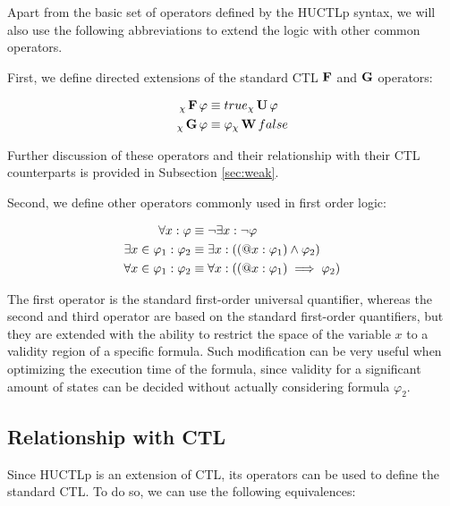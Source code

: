 Apart from the basic set of operators defined by the \ac{HUCTLp} syntax, we will also use the following abbreviations to extend the logic with other common operators.

First, we define directed extensions of the standard \ac{CTL} $\operatorname{\mathbf{F}}$ and $\operatorname{\mathbf{G}}$ operators:

\begin{align*}
	{}_{\chi}\operatorname{\mathbf{F}} \varphi 				 & \equiv true {}_{\chi}\operatorname{\mathbf{U}} \varphi \\
	{}_{\chi}\operatorname{\mathbf{G}} \varphi 				& \equiv \varphi {}_{\chi}\operatorname{\mathbf{W}} false \\
\end{align*}

Further discussion of these operators and their relationship with their \ac{CTL} counterparts is provided in Subsection \ref{sec:weak}.

Second, we define other operators commonly used in first order logic:

\begin{align*}
	\forall x : \varphi 		   		& \equiv \neg \exists x : \neg \varphi \\
	\exists x \in \varphi_1 : \varphi_2 & \equiv \exists x : ((\operatorname{@\!} x : \varphi_1) \land \varphi_2) \\
	\forall x \in \varphi_1 : \varphi_2  & \equiv \forall x : ((\operatorname{@\!} x : \varphi_1) \implies \varphi_2) \\
\end{align*}

The first operator is the standard first-order universal quantifier, whereas the second and third operator are based on the standard first-order quantifiers, but they are extended with the ability to restrict the space of the variable $x$ to a validity region of a specific formula. Such modification can be very useful when optimizing the execution time of the formula, since validity for a significant amount of states can be decided without actually considering formula $\varphi_2$.

\subsection{Relationship with \ac{CTL}}

Since \ac{HUCTLp} is an extension of \ac{CTL}, its operators can be used to define the standard \ac{CTL}. To do so, we can use the following equivalences:

